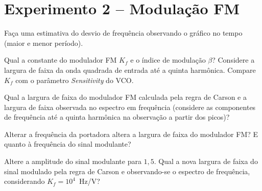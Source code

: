 \documentclass[12pt,addpoints]{exam}
\begin{document}
\section*{Experimento 2 -- Modulação FM}

\begin{questions}
    \question Faça uma estimativa do desvio de frequência observando o gráfico no tempo (maior e menor período). 
    \fillwithlines{0.25in}
    
    \question Qual a constante do modulador FM $K_{f}$ e o índice de modulação $\beta$? Considere a largura de faixa da onda quadrada de entrada até a quinta harmônica. Compare $K_{f}$ com o parâmetro {\it Sensitivity} do VCO.
    \fillwithlines{0.5in}
    
    \question Qual a largura de faixa do modulador FM calculada pela regra de Carson e a largura de faixa observada no espectro em frequência (considere as componentes de frequência até a quinta harmônica na observação a partir dos picos)?%
    \fillwithlines{0.25in}
    
    \question Alterar a frequência da portadora altera a largura de faixa do modulador FM? E quanto à frequência do sinal modulante?
    \fillwithlines{0.5in}
    
    \question Altere a amplitude do sinal modulante para $1,5$. Qual a nova largura de faixa do sinal modulado pela regra de Carson e observando-se o espectro de frequência, considerando $K_{f} = 10^{4}$~Hz/V?
    \fillwithlines{0.25in}
    
\end{questions}

%
%    
\end{document}
